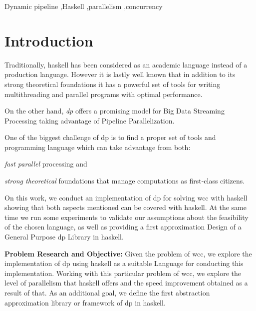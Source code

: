 \documentclass[preprint]{elsarticle}
\begin{document}
\begin{keyword}
Dynamic pipeline \sep Haskell \sep parallelism \sep concurrency
\end{keyword}

\maketitle

\section{Introduction}
Traditionally, \acrfull{haskell} has been considered as an academic language instead of a production language. However it is lastly well known that in addition to its strong theoretical foundations it has a powerful set of tools for writing multithreading and parallel programs with optimal performance.

On the other hand, \textit{\acrfull{dp}} \citep{dpdef} offers a promising model for Big Data Streaming Processing taking advantage of Pipeline Parallelization. 

One of the biggest challenge of \acrshort{dp} is to find a proper set of tools and programming language which can take advantage from both: \begin{inparaenum}[i\upshape)]
\item  \emph{fast parallel} processing and 
\item  \emph{strong theoretical} foundations that manage computations as first-class citizens.
 \end{inparaenum}

On this work, we conduct an implementation of \acrshort{dp} for solving \acrfull{wcc} with \acrshort{haskell} showing that both aspects mentioned can be covered with \acrshort{haskell}. At the same time we run some experiments to validate our assumptions about the feasibility of the chosen language, as well as providing a first approximation Design of a General Purpose \acrshort{dp} Library in \acrshort{haskell}.

\textbf{Problem Research and Objective:}\label{research:obj} Given the problem of \acrshort{wcc}, we explore the implementation of \acrshort{dp} using \acrshort{haskell} as a suitable Language for conducting this implementation. Working with this particular problem of \acrshort{wcc}, we explore the level of parallelism that \acrshort{haskell} offers and the speed improvement obtained as a result of that. As an additional goal, we define the first abstraction approximation  library or framework of \acrshort{dp} in \acrshort{haskell}.
\end{document}
